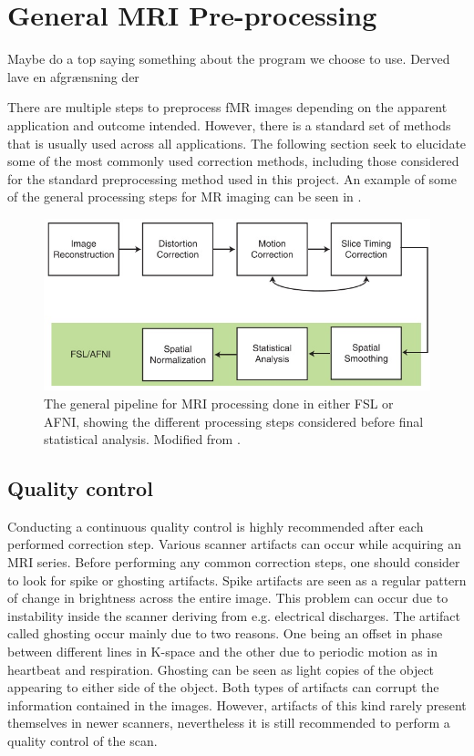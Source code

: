

\section{General MRI Pre-processing}
Maybe do a top saying something about the program we choose to use. Derved lave en afgrænsning der 


There are multiple steps to preprocess fMR images depending on the apparent application and outcome intended. However, there is a standard set of methods that is usually used across all applications. The following section seek to elucidate some of the most commonly used correction methods, including those considered for the standard preprocessing method used in this project. An example of some of the general processing steps for MR imaging can be seen in .\cite{Poldrack2011} 

\begin{figure}[H]                 
	\includegraphics[width=.8\textwidth]{figures/aBackground/processing}  
	\caption{The general pipeline for MRI processing done in either FSL or AFNI, showing the different processing steps considered before final statistical analysis. Modified from \cite{Poldrack2011}.}
	\label{fig:back:pipeline} 
\end{figure}


\subsection{Quality control}
Conducting a continuous quality control is highly recommended after each performed correction step. Various scanner artifacts can occur while acquiring an MRI series. Before performing any common correction steps, one should consider to look for spike or ghosting artifacts. Spike artifacts are seen as a regular pattern of change in brightness across the entire image. This problem can occur due to instability inside the scanner deriving from e.g. electrical discharges.  
The artifact called ghosting occur mainly due to two reasons. One being an offset in phase between different lines in K-space and the other due to periodic motion as in heartbeat and respiration. Ghosting can be seen as light copies of the object appearing to either side of the object. Both types of artifacts can corrupt the information contained in the images. However, artifacts of this kind rarely present themselves in newer scanners, nevertheless it is still recommended to perform a quality control of the scan.\cite{Poldrack2011}

